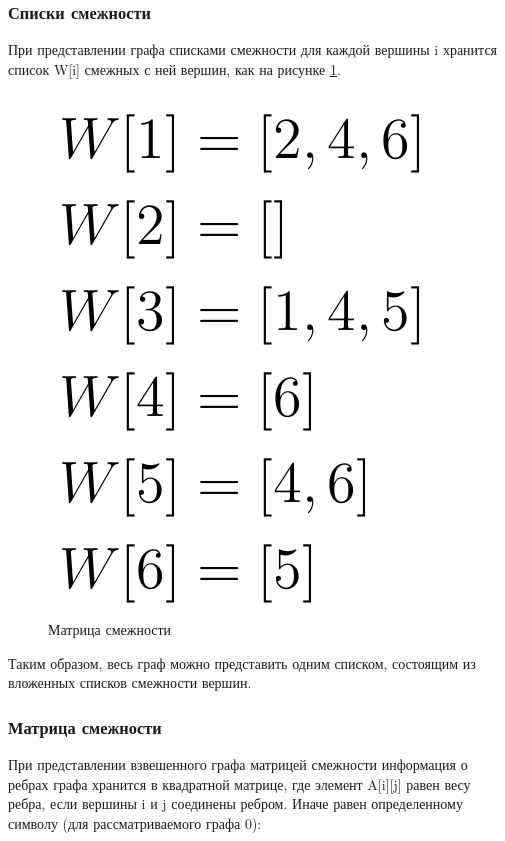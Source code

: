 \subsubsection{Списки смежности}

При представлении графа списками смежности для каждой вершины i хранится список W[i] смежных с ней вершин, как на рисунке \ref{img:graphЦ}.
\begin{figure}[H]
	\begin{center}
		\includegraphics[scale=0.3]{images/matrixW.png}
	\end{center}
	\captionsetup{justification=centering}
	\caption{Матрица смежности}
	\label{img:graphЦ}
\end{figure}

Таким образом, весь граф можно представить одним списком, состоящим из вложенных списков смежности вершин.

\subsubsection{Матрица смежности}

При представлении взвешенного графа матрицей смежности информация о ребрах графа хранится в квадратной матрице, где элемент A[i][j] равен весу ребра, если вершины i и j соединены ребром.  Иначе равен определенному символу (для рассматриваемого графа 0):

